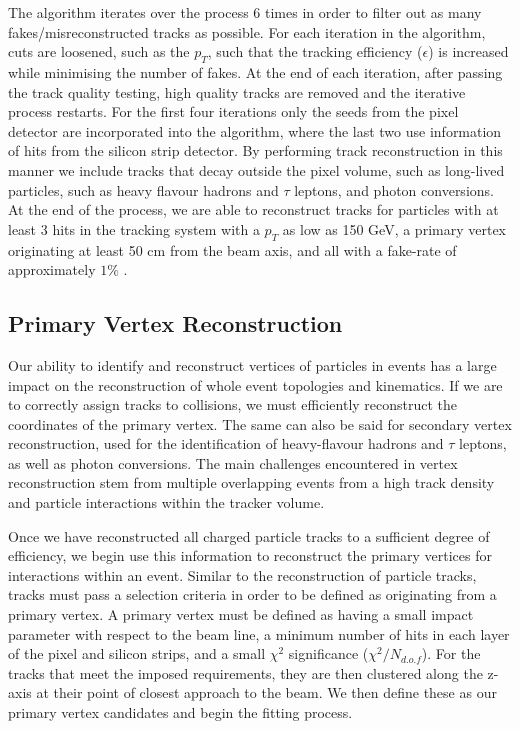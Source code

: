 The algorithm iterates over the process 6 times in order to filter out as many fakes/misreconstructed tracks as possible. For each iteration in the algorithm, cuts are loosened, such as the $p_T$, such that the tracking efficiency ($\epsilon$) is increased while minimising the number of fakes. At the end of each iteration, after passing the track quality testing, high quality tracks are removed and the iterative process restarts. For the first four iterations only the seeds from the pixel detector are incorporated into the algorithm, where the last two use information of hits from the silicon strip detector. By performing track reconstruction in this manner we include tracks that decay outside the pixel volume, such as long-lived particles, such as heavy flavour hadrons and $\tau$ leptons, and photon conversions. At the end of the process, we are able to reconstruct tracks for particles with at least 3 hits in the tracking system with a $p_T$ as low as 150 GeV, a primary vertex originating at least 50 cm from the beam axis, and all with a fake-rate of approximately $1\%$ \cite{1748-0221-9-10-P10009}.


\subsection{Primary Vertex Reconstruction} \label{subsec-PrimaryVertexReconstruction}

Our ability to identify and reconstruct vertices of particles in events has a large impact on the reconstruction of whole event topologies and kinematics. If we are to correctly assign tracks to collisions, we must efficiently reconstruct the coordinates of the primary vertex. The same can also be said for secondary vertex reconstruction, used for the identification of heavy-flavour hadrons and $\tau$ leptons, as well as photon conversions. The main challenges encountered in vertex reconstruction stem from multiple overlapping events from a high track density and particle interactions within the tracker volume. 

Once we have reconstructed all charged particle tracks to a sufficient degree of efficiency, we begin use this information to reconstruct the primary vertices for interactions within an event. Similar to the reconstruction of particle tracks, tracks must pass a selection criteria in order to be defined as originating from a primary vertex. A primary vertex must be defined as having a small impact parameter with respect to the beam line, a minimum number of hits in each layer of the pixel and silicon strips, and a small $\chi^2$ significance ($\chi^2/N_{d.o.f}$). For the tracks that meet the imposed requirements, they are then clustered along the z-axis at their point of closest approach to the beam. We then define these as our primary vertex candidates and begin the fitting process.

